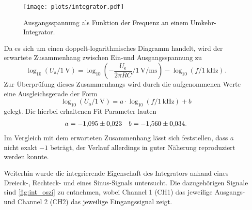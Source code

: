 \begin{figure}[H]
  \centering
  \texttt{[image: plots/integrator.pdf]}
  \caption{Ausgangsspannung als Funktion der Frequenz an einem Umkehr-Integrator.}
  \label{fig:int_messung}
\end{figure}
Da es sich um einen doppelt-logarithmisches Diagramm handelt, wird der erwartete Zusammenhang zwischen Ein-und Ausgangsspannung zu
\begin{equation*}
  \log_{10} (U_\mathrm{a}/\SI{1}{\volt}) = \log_{10} (- \frac{U_\mathrm{e}}{2\pi R C}/\SI{1}{\volt\per\milli\second}) - \log_{10} (f/\SI{1}{\kilo\hertz}).
\end{equation*}
Zur Überprüfung dieses Zusammenhangs wird durch die aufgenommenen Werte eine Ausgleichsgerade der Form
\begin{equation*}
  \log_{10} (U_\mathrm{a}/\SI{1}{\volt}) = a \cdot \log_{10} (f/\SI{1}{\kilo\hertz}) + b
\end{equation*}
gelegt. Die hierbei erhaltenen Fit-Parameter lauten
\begin{align*}
  a = \num{-1.095 \pm 0.023} && b = \num{-1.560 \pm 0.034}.
\end{align*}
Im Vergleich mit dem erwarteten Zusammenhang lässt sich feststellen, dass $a$ nicht exakt $-1$ beträgt, der Verlauf allerdings in guter Näherung reproduziert werden konnte.

Weiterhin wurde die integrierende Eigenschaft des Integrators anhand eines Dreieck-, Rechteck- und eines Sinus-Signals untersucht. Die dazugehörigen Signale sind \autoref{fig:int_oszi} zu entnehmen, wobei Channel 1 (CH1) das jeweilige Ausgangs- und Channel 2 (CH2) das jeweilige Eingangssignal zeigt.

